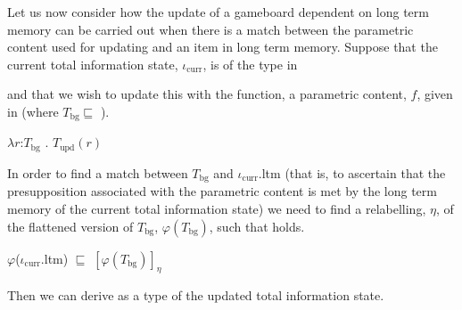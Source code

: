 Let us now consider how the update of a gameboard dependent on long
term memory can be carried out when there is a match between the
parametric content used for updating and an item in long term memory.
Suppose that the current total information state, $\iota_{\mathrm{curr}}$, is of the type in \nexteg{}
\begin{ex} 
\end{ex} 
and that we wish to update this with the function, a
parametric content, $f$, given in \nexteg{} (where
$T_{\mathrm{bg}}\sqsubseteq$ ).
\begin{ex} 
$\lambda r$:$T_{\mathrm{bg}}$ . $T_{\mathrm{upd}}(r)$ 
\end{ex} 
In order to find a match between $T_{\mathrm{bg}}$ and $\iota_{\mathrm{curr}}$.ltm
(that is, to ascertain that the presupposition associated with the
parametric content is met by the long term memory of the current total
information state) we need to find a relabelling, $\eta$, of the flattened
version of $T_{\mathrm{bg}}$, $\varphi(T_{\mathrm{bg}})$, such that
\nexteg{} holds.
\begin{ex} 
$\varphi$($\iota_{\mathrm{curr}}$.ltm) $\sqsubseteq$ $[\varphi(T_{\mathrm{bg}})]_\eta$ 
\end{ex} 
Then we can derive \nexteg{} as a type of the updated total
information state.
\begin{ex} 

 
\end{ex} 
